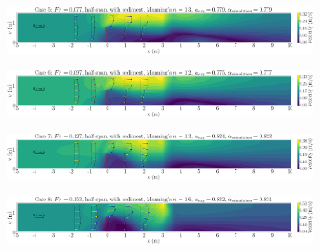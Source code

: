 \documentclass[preview, border=2pt]{standalone}
\begin{document}
\begin{figure}
     \centering
     \begin{subfigure}[b]{0.95\textwidth}
         \centering
         \caption{}
         \includegraphics[width=\textwidth]{exp_vel_mag_contour_ManningN_0005.png}
     \end{subfigure}
     \hfill     
     \begin{subfigure}[b]{0.95\textwidth}
         \centering
         \caption{}
         \includegraphics[width=\textwidth]{exp_vel_mag_contour_ManningN_0006.png}
     \end{subfigure}
     \hfill     
     \begin{subfigure}[b]{0.95\textwidth}
         \centering
         \caption{}
         \includegraphics[width=\textwidth]{exp_vel_mag_contour_ManningN_0007.png}
     \end{subfigure}
     \hfill     
     \begin{subfigure}[b]{0.95\textwidth}
         \centering
         \caption{}
         \includegraphics[width=\textwidth]{exp_vel_mag_contour_ManningN_0008.png}
     \end{subfigure}     
\end{figure}
\end{document}
